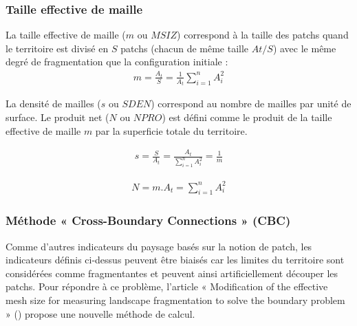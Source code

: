 \documentclass[11pt]{article}
\newcommand{\mycite}[1]{ (\cite{#1})}
\begin{document}
\subsubsection{Taille effective de maille}

La taille effective de maille ($m$ ou $MSIZ$) correspond à la taille des patchs quand le territoire est divisé en $S$ patchs (chacun de même taille $At/S$) avec le même degré de fragmentation que la configuration initiale :
\begin{align*}
m = \frac{A_{t}}{S} = \frac{1}{A_{t}}\sum_{i=1}^{n}A_{i}^{2}
\end{align*}

La densité de mailles ($s$ ou $SDEN$) correspond au nombre de mailles par unité de surface.
Le produit net ($N$ ou $NPRO$) est défini comme le produit de la taille effective de maille $m$ par la superficie totale du territoire.

\hspace*{-0.5cm}
\begin{minipage}[c][1cm]{.46\linewidth}
\begin{align*}
s = \frac{S}{A_{t}} = \frac{A_{t}}{\sum_{i=1}^{n}A_{i}^{2}} = \frac{1}{m}
\end{align*}
\end{minipage}
\begin{minipage}[c][1cm]{.46\linewidth}
\begin{align*}
N = m.{A_{t}} = \sum_{i=1}^{n}A_{i}^{2}
\end{align*}
\end{minipage}





\subsubsection{Méthode « Cross-Boundary Connections » (CBC)}
\label{sec:cbc}

Comme d'autres indicateurs du paysage basés sur la notion de patch, les indicateurs définis ci-dessus peuvent être biaisés car les limites du territoire sont considérées comme fragmentantes et peuvent ainsi artificiellement découper les patchs. Pour répondre à ce problème, l'article « Modification of the effective mesh size for measuring landscape fragmentation to solve the boundary problem »\mycite{moser} propose une nouvelle méthode de calcul.
\end{document}
